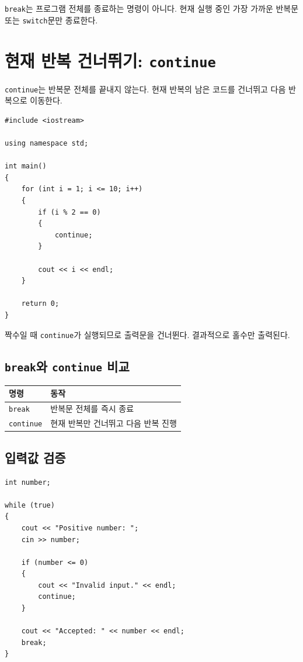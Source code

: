 \documentclass[11pt,a4paper]{article}
\begin{document}
\begin{importantbox}
\texttt{break}는 프로그램 전체를 종료하는 명령이 아니다.
현재 실행 중인 가장 가까운 반복문 또는 \texttt{switch}문만 종료한다.
\end{importantbox}

\section{현재 반복 건너뛰기: \texttt{continue}}

\texttt{continue}는 반복문 전체를 끝내지 않는다.
현재 반복의 남은 코드를 건너뛰고 다음 반복으로 이동한다.

\begin{lstlisting}
#include <iostream>

using namespace std;

int main()
{
    for (int i = 1; i <= 10; i++)
    {
        if (i % 2 == 0)
        {
            continue;
        }

        cout << i << endl;
    }

    return 0;
}
\end{lstlisting}

짝수일 때 \texttt{continue}가 실행되므로 출력문을 건너뛴다.
결과적으로 홀수만 출력된다.

\subsection{\texttt{break}와 \texttt{continue} 비교}

\begin{center}
\begin{tabular}{ll}
\toprule
명령 & 동작 \\
\midrule
\texttt{break} & 반복문 전체를 즉시 종료 \\
\texttt{continue} & 현재 반복만 건너뛰고 다음 반복 진행 \\
\bottomrule
\end{tabular}
\end{center}

\subsection{입력값 검증}

\begin{lstlisting}
int number;

while (true)
{
    cout << "Positive number: ";
    cin >> number;

    if (number <= 0)
    {
        cout << "Invalid input." << endl;
        continue;
    }

    cout << "Accepted: " << number << endl;
    break;
}
\end{lstlisting}
\end{document}
